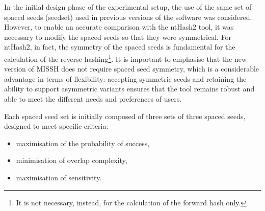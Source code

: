 	
	In the initial design phase of the experimental setup, the use of the same set of spaced seeds (seedset) used in previous versions of the software was considered. However, to enable an accurate comparison with the ntHash2 tool, it was necessary to modify the spaced seeds so that they were symmetrical. For ntHash2, in fact, the symmetry of the spaced seeds is fundamental for the calculation of the reverse hashing\footnote{It is not necessary, instead, for the calculation of the forward hash only.}. It is important to emphasise that the new version of \acs{MISSH} does not require spaced seed symmetry, which is a considerable advantage in terms of flexibility: accepting symmetric seeds and retaining the ability to support asymmetric variants ensures that the tool remains robust and able to meet the different needs and preferences of users.
	
	Each spaced seed set is initially composed of three sets of three spaced seeds, designed to meet specific criteria:
	\begin{itemize}
		\item maximisation of the probability of success,
		\item minimisation of overlap complexity,
		\item maximisation of sensitivity.
	\end{itemize}
	
